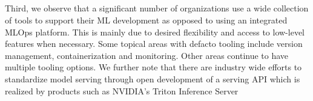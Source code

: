
\DIFdelend \DIFaddbegin \subsection{}
\DIFaddend Third, we observe that a significant number of organizations use a wide collection of tools to support their ML development as opposed to using an integrated MLOps platform. This is mainly due to desired flexibility and access to low-level features when necessary. Some topical areas with defacto tooling include version management, containerization and monitoring. Other areas continue to have multiple tooling options. We further note that there are industry wide efforts to standardize model serving through open development of a serving API which is realized by products such as NVIDIA's Triton Inference Server\DIFdelbegin {}\DIFdelend \DIFaddbegin {}\DIFaddend 

\DIFaddbegin 


